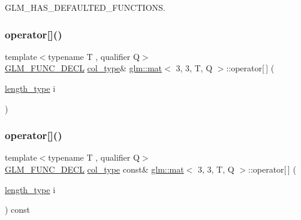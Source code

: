 G\+L\+M\+\_\+\+H\+A\+S\+\_\+\+D\+E\+F\+A\+U\+L\+T\+E\+D\+\_\+\+F\+U\+N\+C\+T\+I\+O\+NS. 

\mbox{\label{structglm_1_1mat_3_013_00_013_00_01_t_00_01_q_01_4_a2507891a0a3b6c233c4f8a58071a7d9e}} 
\subsubsection{\texorpdfstring{operator[]()}{operator[]()}\hspace{0.1cm}{\footnotesize\ttfamily [1/2]}}
{\footnotesize\ttfamily template$<$typename T , qualifier Q$>$ \\
\mbox{\hyperlink{setup_8hpp_ab2d052de21a70539923e9bcbf6e83a51}{G\+L\+M\+\_\+\+F\+U\+N\+C\+\_\+\+D\+E\+CL}} \mbox{\hyperlink{structglm_1_1mat_3_013_00_013_00_01_t_00_01_q_01_4_a4d84bef3685131dbb0ac43cac0a3b147}{col\+\_\+type}}\& \mbox{\hyperlink{structglm_1_1mat}{glm\+::mat}}$<$ 3, 3, T, Q $>$\+::operator\mbox{[}$\,$\mbox{]} (\begin{DoxyParamCaption}\item[{\mbox{\hyperlink{structglm_1_1mat_3_013_00_013_00_01_t_00_01_q_01_4_ae1b8524f20936516a48384a2841b5b9d}{length\+\_\+type}}}]{i }\end{DoxyParamCaption})}

\mbox{\label{structglm_1_1mat_3_013_00_013_00_01_t_00_01_q_01_4_abce9d671a13bf9f9a315b7f8b5042617}} 
\subsubsection{\texorpdfstring{operator[]()}{operator[]()}\hspace{0.1cm}{\footnotesize\ttfamily [2/2]}}
{\footnotesize\ttfamily template$<$typename T , qualifier Q$>$ \\
\mbox{\hyperlink{setup_8hpp_ab2d052de21a70539923e9bcbf6e83a51}{G\+L\+M\+\_\+\+F\+U\+N\+C\+\_\+\+D\+E\+CL}} \mbox{\hyperlink{structglm_1_1mat_3_013_00_013_00_01_t_00_01_q_01_4_a4d84bef3685131dbb0ac43cac0a3b147}{col\+\_\+type}} const\& \mbox{\hyperlink{structglm_1_1mat}{glm\+::mat}}$<$ 3, 3, T, Q $>$\+::operator\mbox{[}$\,$\mbox{]} (\begin{DoxyParamCaption}\item[{\mbox{\hyperlink{structglm_1_1mat_3_013_00_013_00_01_t_00_01_q_01_4_ae1b8524f20936516a48384a2841b5b9d}{length\+\_\+type}}}]{i }\end{DoxyParamCaption}) const}



